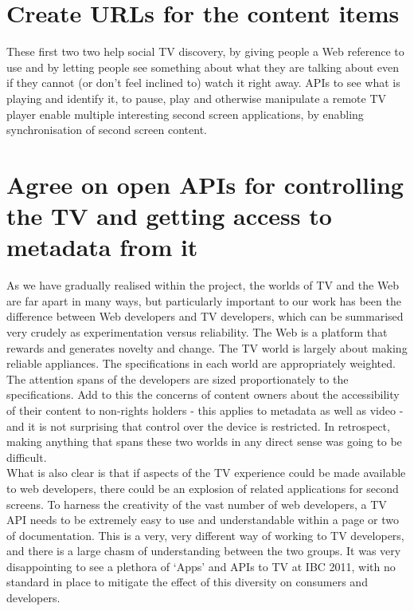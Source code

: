 \documentclass{notube}
\begin{document}
\section{Create URLs for the content items}

These first two two help social TV discovery, by giving people a Web reference to use and by letting people see something about what they are talking about even if they cannot (or don't feel inclined to) watch it right away.  APIs to see what is playing and identify it, to pause, play and otherwise manipulate a remote TV player enable multiple interesting second screen applications, by enabling synchronisation of second screen content.

\section{Agree on open APIs for controlling the TV and getting access to metadata from it}

As we have gradually realised within the project, the worlds of TV and the Web are far apart in many ways, but particularly important to our work has been the difference between Web developers and TV developers, which can be summarised very crudely as experimentation versus reliability. The Web is a platform that rewards and generates novelty and change. The TV world is largely about making reliable appliances. The specifications in each world are appropriately weighted. The attention spans of the developers are sized proportionately to the specifications. Add to this the concerns of content owners about the accessibility of   their content to non-rights holders - this applies to metadata as well as video - and it is not surprising that control over the device is restricted. In retrospect, making anything that spans these two worlds in any direct sense was going to be difficult.
\\

What is also clear is that if aspects of the TV experience could be made available to web developers, there could be an explosion of related applications for second screens. To harness the creativity of the vast number of web developers, a TV API needs to be extremely easy to use and understandable within a page or two of documentation. This is a very, very different way of working to TV developers, and there is a large chasm of understanding between the two groups. It was very disappointing to see a plethora of `Apps' and APIs to TV at IBC 2011, with no standard in place to mitigate the effect of this diversity on consumers and developers.
\end{document}
